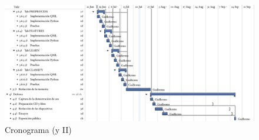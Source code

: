 \begin{landscape}
\begin{figure}[htbp]
\centering
\vspace*{0.6cm}
\includegraphics[width=24cm]{gantt2b.pdf}
\caption{Cronograma (y II)}
\label{fig:gantt2}
\end{figure}
\end{landscape}
